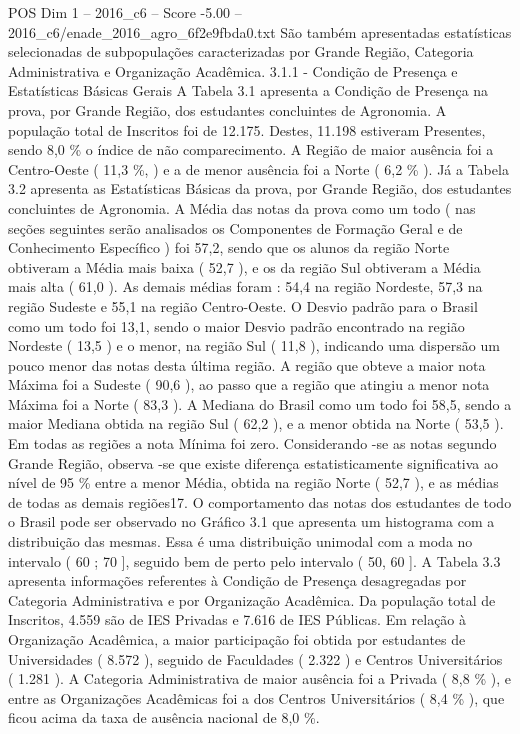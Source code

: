 \begin{textsample}{POS Dim 1 – 2016\_c6 – Score -5.00 – 2016\_c6/enade\_2016\_agro\_6f2e9fbda0.txt}
São também apresentadas estatísticas selecionadas de subpopulações caracterizadas por Grande Região, Categoria Administrativa e Organização Acadêmica. 3.1.1 - Condição de Presença e Estatísticas Básicas Gerais A Tabela 3.1 apresenta a Condição de Presença na prova, por Grande Região, dos estudantes concluintes de Agronomia.
A população total de Inscritos foi de 12.175.
Destes, 11.198 estiveram Presentes, sendo 8,0 \% o índice de não comparecimento.
A Região de maior ausência foi a Centro-Oeste ( 11,3 \%, ) e a de menor ausência foi a Norte ( 6,2 \% ).
Já a Tabela 3.2 apresenta as Estatísticas Básicas da prova, por Grande Região, dos estudantes concluintes de Agronomia.
A Média das notas da prova como um todo ( nas seções seguintes serão analisados os Componentes de Formação Geral e de Conhecimento Específico ) foi 57,2, sendo que os alunos da região Norte obtiveram a Média mais baixa ( 52,7 ), e os da região Sul obtiveram a Média mais alta ( 61,0 ).
As demais médias foram : 54,4 na região Nordeste, 57,3 na região Sudeste e 55,1 na região Centro-Oeste.
O Desvio padrão para o Brasil como um todo foi 13,1, sendo o maior Desvio padrão encontrado na região Nordeste ( 13,5 ) e o menor, na região Sul ( 11,8 ), indicando uma dispersão um pouco menor das notas desta última região.
A região que obteve a maior nota Máxima foi a Sudeste ( 90,6 ), ao passo que a região que atingiu a menor nota Máxima foi a Norte ( 83,3 ).
A Mediana do Brasil como um todo foi 58,5, sendo a maior Mediana obtida na região Sul ( 62,2 ), e a menor obtida na Norte ( 53,5 ).
Em todas as regiões a nota Mínima foi zero.
Considerando -se as notas segundo Grande Região, observa -se que existe diferença estatisticamente significativa ao nível de 95 \% entre a menor Média, obtida na região Norte ( 52,7 ), e as médias de todas as demais regiões17.
O comportamento das notas dos estudantes de todo o Brasil pode ser observado no Gráfico 3.1 que apresenta um histograma com a distribuição das mesmas.
Essa é uma distribuição unimodal com a moda no intervalo ( 60 ; 70 ], seguido bem de perto pelo intervalo ( 50, 60 ].
A Tabela 3.3 apresenta informações referentes à Condição de Presença desagregadas por Categoria Administrativa e por Organização Acadêmica.
Da população total de Inscritos, 4.559 são de IES Privadas e 7.616 de IES Públicas.
Em relação à Organização Acadêmica, a maior participação foi obtida por estudantes de Universidades ( 8.572 ), seguido de Faculdades ( 2.322 ) e Centros Universitários ( 1.281 ).
A Categoria Administrativa de maior ausência foi a Privada ( 8,8 \% ), e entre as Organizações Acadêmicas foi a dos Centros Universitários ( 8,4 \% ), que ficou acima da taxa de ausência nacional de 8,0 \%.

\end{textsample}
